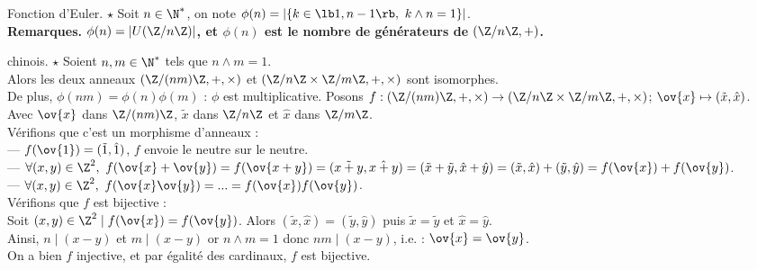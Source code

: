 \documentclass[11pt]{article}
\begin{document}
\begin{defi}{Fonction d'Euler. $\star$}{}
    Soit $n\in\N^*$, on note $\phi(n)=|\{k\in\lb1,n-1\rb, ~ k \land n = 1\}|$.\\
    \bf{Remarques.} $\phi(n)=|U(\Z/n\Z)|$, et $\phi(n)$ est le nombre de générateurs de $(\Z/n\Z,+)$.
\end{defi}

\begin{thm}{chinois. $\star$}{}
    Soient $n,m\in\N^*$ tels que $n\land m=1$.\\
    Alors les deux anneaux $(\Z/(nm)\Z,+,\times)$ et $(\Z/n\Z\times\Z/m\Z,+,\times)$ sont isomorphes.\\
    De plus, $\phi(nm)=\phi(n)\phi(m)$ : $\phi$ est multiplicative.
    \tcblower
    Posons $f:(\Z/(nm)\Z,+,\times)\to(\Z/n\Z\times\Z/m\Z,+,\times)$; $\ov{x}\mapsto(\tilde{x},\hat{x})$.\\
    Avec $\ov{x}$ dans $\Z/(nm)\Z$, $\tilde{x}$ dans $\Z/n\Z$ et $\hat{x}$ dans $\Z/m\Z$.\\
    Vérifions que c'est un morphisme d'anneaux :\\
    --- $f(\ov{1})=(\tilde{1},\hat{1})$, $f$ envoie le neutre sur le neutre.\\
    --- $\forall (x,y) \in \Z^2, ~ f(\ov{x}+\ov{y})=f(\ov{x+y})=(\tilde{x+y},\hat{x+y})=(\tilde{x}+\tilde{y},\hat{x}+\hat{y})=(\tilde{x},\hat{x})+(\tilde{y},\hat{y})=f(\ov{x})+f(\ov{y})$.\\
    --- $\forall (x,y) \in \Z^2, ~ f(\ov{x}\ov{y})=...=f(\ov{x})f(\ov{y})$.\\
    Vérifions que $f$ est bijective :\\
    Soit $(x,y)\in\Z^2 \mid f(\ov{x})=f(\ov{y})$. Alors $(\tilde{x},\hat{x})=(\tilde{y},\hat{y})$ puis $\tilde{x}=\tilde{y}$ et $\hat{x}=\hat{y}$.\\
    Ainsi, $n \mid (x-y)$ et $m \mid (x-y)$ or $n\land m = 1$ donc $nm \mid (x-y)$, i.e. : $\ov{x}=\ov{y}$.\\
    On a bien $f$ injective, et par égalité des cardinaux, $f$ est bijective.
\end{thm}
\end{document}
